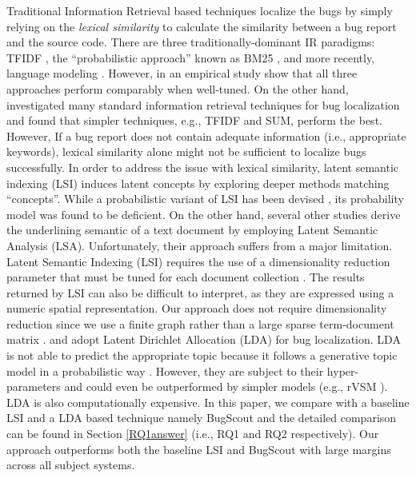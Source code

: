 \documentclass[sigconf,review,anonymous]{acmart}
\begin{document}
Traditional Information Retrieval based techniques localize the bugs by simply relying on the \emph{lexical similarity} to calculate the similarity between a bug report and the source code. 
There are three traditionally-dominant IR paradigms: TFIDF \cite{Salton}, the “probabilistic approach” known as BM25 \cite{Robertson}, and more recently, language modeling \cite{Ponte}. However, in an empirical study \citet{Fang} show that all three approaches perform comparably when well-tuned. On the other hand, \citet{Rao} investigated many standard information retrieval techniques for bug localization and found that simpler techniques, e.g., TFIDF and SUM, perform the best. However, If a bug report does not contain adequate information (i.e., appropriate keywords), lexical similarity alone might not be sufficient to localize bugs successfully. In order to address the issue with lexical similarity, 
latent semantic indexing (LSI) induces latent concepts by exploring deeper methods matching “concepts”. While a probabilistic variant of LSI has been devised \cite{Hofmann}, its probability model was found to be deficient. On the other hand, several other studies \cite{Maletic, MarcusMaletic,irmarcus} derive the underlining semantic of a text document by employing Latent Semantic Analysis (LSA).
Unfortunately, their approach suffers from a major limitation.
Latent Semantic Indexing (LSI) requires the use of a dimensionality reduction parameter that must be tuned for each document collection \cite{Kontostathis}.
The results returned by LSI can also be difficult to interpret, as
they are expressed using a numeric spatial representation.
Our approach does not require dimensionality reduction since we use a finite graph rather than a large sparse term-document matrix \cite{MarcusLSI,MarcusMaletic}.
\citet{LukinsBL} and \cite{Nguyen} adopt Latent Dirichlet Allocation (LDA) for bug localization. LDA is not able to predict the appropriate topic because it follows a generative topic model in a probabilistic way \cite{Lukins}. However, they are subject to their hyper-parameters and could even be outperformed by simpler models (e.g., rVSM \cite{Jian}).  
LDA is also computationally expensive. In this paper, we compare with a baseline LSI \cite{MarcusLSI} and a LDA based technique namely BugScout \cite{Nguyen} and the detailed comparison can be found in Section \ref{RQ1answer} (i.e., RQ1 and RQ2 respectively). Our approach outperforms both the baseline LSI \cite{MarcusLSI} and BugScout \cite{Nguyen} with large margins across all subject systems. 
\end{document}
